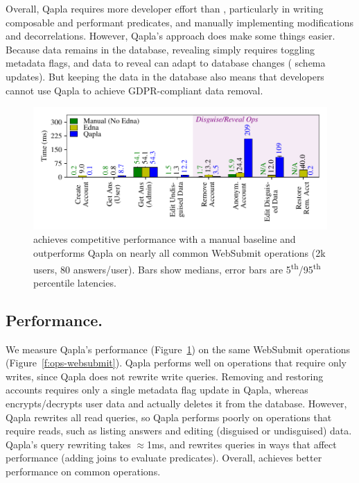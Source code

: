 Overall, Qapla requires more developer effort than \sys, particularly in writing
composable and performant predicates, and manually implementing modifications
and decorrelations. However, Qapla's approach does make some things easier.
%
Because data remains in the database, revealing simply requires toggling
metadata flags, and data to reveal can adapt to database changes (\eg
schema updates). But keeping the data in the database also means that developers cannot use Qapla to
achieve GDPR-compliant data removal. %

%
\begin{figure}[t]
  \centering
      \includegraphics[width=\columnwidth]{figs/websubmit_qapla_op_stats}
    \caption{\sys achieves competitive performance with a manual baseline and
    outperforms Qapla on nearly all common WebSubmit operations (2k users,
    80 answers/user).
    Bars show medians, error bars are 5\textsuperscript{th}/95\textsuperscript{th}
    percentile latencies.}
  \label{f:qapla_ws_opstats}
\end{figure}

%
\subsection{Performance.}
\label{s:eval-qapla-perf}
%
We measure Qapla's performance (Figure~\ref{f:qapla_ws_opstats}) on the same
WebSubmit operations (Figure~\ref{f:ops-websubmit}).
%
Qapla performs well on operations that require only writes, since Qapla does not
rewrite write queries.  Removing and restoring accounts requires only a single
metadata flag update in Qapla, whereas \sys encrypts/decrypts user data and
actually deletes it from the database.
%
However, Qapla rewrites all read queries, so Qapla performs poorly on operations
that require reads, such as listing answers and editing (disguised or
undisguised) data.
%
Qapla's query rewriting takes $\approx$1ms, and rewrites  queries in
ways that affect performance (\eg adding joins to evaluate predicates).
%
Overall, \sys achieves better performance on common operations.

%
